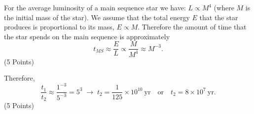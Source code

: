 For the average luminosity of a main sequence star we have: $L \propto M^4$
(where $M$ is the initial mass of the star). We assume that the total energy
$E$ that the star produces is proportional to its mass, $E \propto M$.
Therefore the amount of time that the star spends on the main sequence is
approximately
\[
  t_{MS} \approx \frac{E}{L} \propto \frac{M}{M^4} \approx M^{-3}.
\]
\hfill(5 Points)

Therefore,
\[
  \frac{t_1}{t_2} \approx \frac{1^{-3}}{5^{-3}} = 5^3
  \;\rightarrow\;
  t_2 = \frac{1}{125}\times10^{10}\ \mathrm{yr}
  \quad\text{or}\quad t_2 = 8\times10^{7}\ \mathrm{yr}.
\]
\hfill(5 Points)
